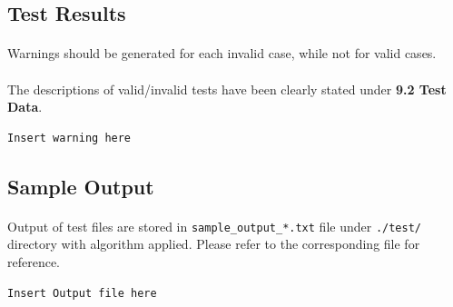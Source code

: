 \documentclass{article}
\begin{document}
        \subsection{Test Results}
            \paragraph{}
                Warnings should be generated for each invalid case, while not for valid cases. 
            \paragraph{}
                The descriptions of valid/invalid tests have been clearly stated under
                \textbf{9.2 Test Data}.
            \begin{Verbatim}[gobble=8]
                Insert warning here
            \end{Verbatim}
        \subsection{Sample Output}
            \paragraph{}
                Output of test files are stored in \texttt{sample\_output\_*.txt} file under
                \texttt{./test/} directory with algorithm applied. Please refer to the
                corresponding file for reference.
            \begin{Verbatim}[gobble=8]
                Insert Output file here
            \end{Verbatim}
\end{document}
